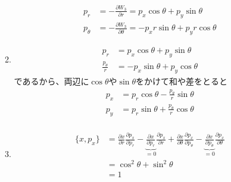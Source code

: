 \documentclass{jsarticle}
\begin{document}
\begin{enumerate}
\begin{enumerate}
$$\begin{aligned}
                    p_r      & = -\frac{\partial W_3}{\partial r} = p_x \cos \theta + p_y \sin \theta           \\
                    p_\theta & = -\frac{\partial W_3}{\partial \theta} = -p_x r \sin \theta + p_y r \cos \theta
                  \end{aligned}
                $$
          \item
                $$
                  \begin{aligned}
                    p_r                & = p_x \cos \theta + p_y \sin \theta  \\
                    \frac{p_\theta}{r} & = -p_x \sin \theta + p_y \cos \theta
                  \end{aligned}
                $$
                であるから、両辺に$\cos \theta$や$\sin \theta$をかけて和や差をとると
                $$
                  \begin{aligned}
                    p_x & = p_r \cos \theta - \frac{p_\theta}{r} \sin \theta \\
                    p_y & = p_r \sin \theta + \frac{p_\theta}{r} \cos \theta \\
                  \end{aligned}
                $$
          \item
                $$
                  \begin{aligned}
                    \{x, p_x\} & = \frac{\partial x}{\partial r}\frac{\partial p_x}{\partial p_r}
                    -
                    \underbrace{\frac{\partial x}{\partial p_r}}_{=0}\frac{\partial p_x}{\partial r}
                    + \frac{\partial x}{\partial \theta}\frac{\partial p_x}{\partial p_\theta}
                    -
                    \underbrace{\frac{\partial x}{\partial p_\theta}}_{=0}\frac{\partial p_x}{\partial \theta} \\
                               & = \cos^2 \theta + \sin^2 \theta                                               \\
                               & = 1
                  \end{aligned}
                $$
        \end{enumerate}
\end{enumerate}
\end{document}
